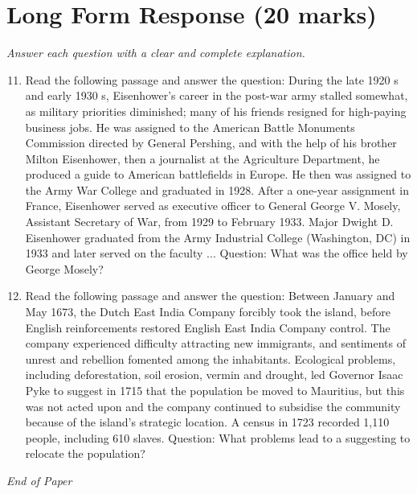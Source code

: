 \documentclass[12pt]{article}
\begin{document}
\section*{Long Form Response (20 marks)}
\textit{Answer each question with a clear and complete explanation.}
\begin{enumerate}[label=\arabic*.]
\setcounter{enumi}{10}
\item Read the following passage and answer the question: During the late 1920 s and early 1930 s, Eisenhower's career in the post-war army stalled somewhat, as military priorities diminished; many of his friends resigned for high-paying business jobs. He was assigned to the American Battle Monuments Commission directed by General Pershing, and with the help of his brother Milton Eisenhower, then a journalist at the Agriculture Department, he produced a guide to American battlefields in Europe. He then was assigned to the Army War College and graduated in 1928. After a one-year assignment in France, Eisenhower served as executive officer to General George V. Mosely, Assistant Secretary of War, from 1929 to February 1933. Major Dwight D. Eisenhower graduated from the Army Industrial College (Washington, DC) in 1933 and later served on the faculty ... Question: What was the office held by George Mosely?
\item Read the following passage and answer the question: Between January and May 1673, the Dutch East India Company forcibly took the island, before English reinforcements restored English East India Company control. The company experienced difficulty attracting new immigrants, and sentiments of unrest and rebellion fomented among the inhabitants. Ecological problems, including deforestation, soil erosion, vermin and drought, led Governor Isaac Pyke to suggest in 1715 that the population be moved to Mauritius, but this was not acted upon and the company continued to subsidise the community because of the island's strategic location. A census in 1723 recorded 1,110 people, including 610 slaves. Question: What problems lead to a suggesting to relocate the population?
\end{enumerate}

\vfill
\noindent\textit{End of Paper}
\end{document}
